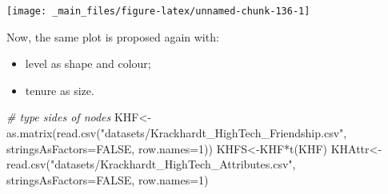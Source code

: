 \documentclass[
  notitlepage,
  onecolumn,
  openany]{book}
\newenvironment{Shaded}{\begin{snugshade}}{\end{snugshade}}
\newcommand{\AttributeTok}[1]{\textcolor[rgb]{0.77,0.63,0.00}{#1}}
\newcommand{\CommentTok}[1]{\textcolor[rgb]{0.56,0.35,0.01}{\textit{#1}}}
\newcommand{\ConstantTok}[1]{\textcolor[rgb]{0.00,0.00,0.00}{#1}}
\newcommand{\DecValTok}[1]{\textcolor[rgb]{0.00,0.00,0.81}{#1}}
\newcommand{\FunctionTok}[1]{\textcolor[rgb]{0.00,0.00,0.00}{#1}}
\newcommand{\NormalTok}[1]{#1}
\newcommand{\OtherTok}[1]{\textcolor[rgb]{0.56,0.35,0.01}{#1}}
\newcommand{\SpecialCharTok}[1]{\textcolor[rgb]{0.00,0.00,0.00}{#1}}
\newcommand{\StringTok}[1]{\textcolor[rgb]{0.31,0.60,0.02}{#1}}
\providecommand{\tightlist}{%
  \setlength{\itemsep}{0pt}\setlength{\parskip}{0pt}}
\begin{document}
\begin{center}\texttt{[image: \_main\_files/figure-latex/unnamed-chunk-136-1]} \end{center}

Now, the same plot is proposed again with:

\begin{itemize}
\tightlist
\item
  level as shape and colour;
\item
  tenure as size.
\end{itemize}

\begin{Shaded}
\begin{Highlighting}[]
\CommentTok{\# type sides of nodes}
\NormalTok{KHF}\OtherTok{\textless{}{-}}\FunctionTok{as.matrix}\NormalTok{(}\FunctionTok{read.csv}\NormalTok{(}\StringTok{"datasets/Krackhardt\_HighTech\_Friendship.csv"}\NormalTok{,}
                        \AttributeTok{stringsAsFactors=}\ConstantTok{FALSE}\NormalTok{, }\AttributeTok{row.names=}\DecValTok{1}\NormalTok{))}
\NormalTok{KHFS}\OtherTok{\textless{}{-}}\NormalTok{KHF}\SpecialCharTok{*}\FunctionTok{t}\NormalTok{(KHF)}
\NormalTok{KHAttr}\OtherTok{\textless{}{-}}\FunctionTok{read.csv}\NormalTok{(}\StringTok{"datasets/Krackhardt\_HighTech\_Attributes.csv"}\NormalTok{,}
                 \AttributeTok{stringsAsFactors=}\ConstantTok{FALSE}\NormalTok{, }\AttributeTok{row.names=}\DecValTok{1}\NormalTok{)}


\end{Highlighting}
\end{Shaded}
\end{document}
